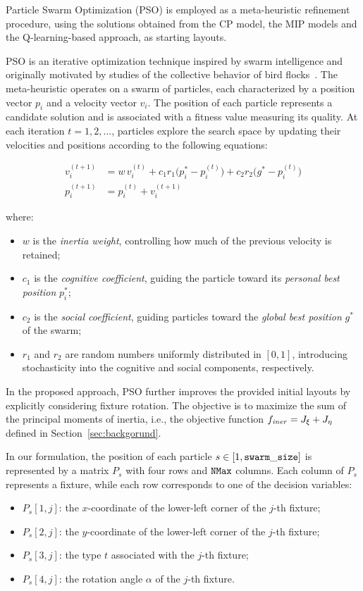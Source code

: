 \label{sec:pso_algorithm}

Particle Swarm Optimization (PSO) is employed as a meta-heuristic refinement procedure, using the solutions obtained from the CP model, the MIP models and the Q-learning-based approach, as starting layouts. 

PSO is an iterative optimization technique inspired by swarm intelligence and originally motivated by studies of the collective behavior of bird flocks~\cite{sun2022particle,liu2006solving}. The meta-heuristic operates on a swarm of particles, each characterized by a position vector \(p_i\) and a velocity vector \(v_i\). The position of each particle represents a candidate solution and is associated with a fitness value measuring its quality. At each iteration \(t=1,2,\ldots\), particles explore the search space by updating their velocities and positions according to the following equations:

\begin{align*}
	v_i^{(t+1)} &= w \, v_i^{(t)}
	+ c_1 r_1 \big( p_i^* - p_i^{(t)} \big)
	+ c_2 r_2 \big( g^* - p_i^{(t)} \big) \\
	p_i^{(t+1)} &= p_i^{(t)} + v_i^{(t+1)}
\end{align*}

where:
\begin{itemize}
	\item \(w\) is the \emph{inertia weight}, controlling how much of the previous velocity is retained;
	\item \(c_1\) is the \emph{cognitive coefficient}, guiding the particle toward its \emph{personal best position} \(p_i^*\);
	\item \(c_2\) is the \emph{social coefficient}, guiding particles toward the \emph{global best position} \(g^*\) of the swarm;
	\item \(r_1\) and \(r_2\) are random numbers uniformly distributed in \([0,1]\), introducing stochasticity into the cognitive and social components, respectively.
\end{itemize}

In the proposed approach, PSO further improves the provided initial layouts by explicitly considering fixture rotation. The objective is to maximize the sum of the principal moments of inertia, i.e., the objective function \(f_\mathit{iner} = J_\xi + J_\eta\) defined in Section~\ref{sec:backgorund}.

In our formulation, the position of each particle \(s \in [1,\mathtt{swarm\_size}]\) is represented by a matrix \(P_s\) with four rows and \(\mathtt{NMax}\) columns. Each column of \(P_s\) represents a fixture, while each row corresponds to one of the decision variables:
\begin{itemize}
	\item $P_s[1,j]$: the $x$-coordinate of the lower-left corner of the $j$-th fixture;
	\item $P_s[2,j]$: the $y$-coordinate of the lower-left corner of the $j$-th fixture;
	\item $P_s[3,j]$: the type $t$ associated with the $j$-th fixture;
	\item $P_s[4,j]$: the rotation angle $\alpha$ of the $j$-th fixture.
\end{itemize}

